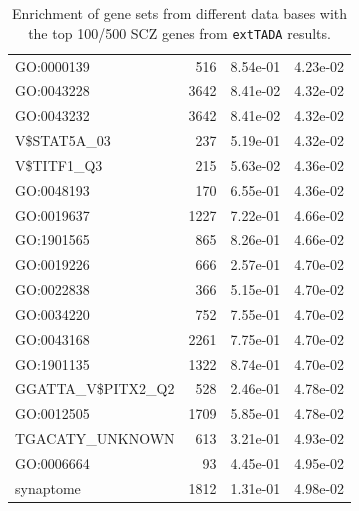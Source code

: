 \documentclass[]{article}
\begin{document}
\begin{table}[H]
\begin{tabular}{|l|rrr|}
GO:0000139 & 516 & 8.54e-01 & 4.23e-02\\
GO:0043228 & 3642 & 8.41e-02 & 4.32e-02\\
GO:0043232 & 3642 & 8.41e-02 & 4.32e-02\\
V\$STAT5A\_03 & 237 & 5.19e-01 & 4.32e-02\\
V\$TITF1\_Q3 & 215 & 5.63e-02 & 4.36e-02\\
GO:0048193 & 170 & 6.55e-01 & 4.36e-02\\
GO:0019637 & 1227 & 7.22e-01 & 4.66e-02\\
GO:1901565 & 865 & 8.26e-01 & 4.66e-02\\
GO:0019226 & 666 & 2.57e-01 & 4.70e-02\\
GO:0022838 & 366 & 5.15e-01 & 4.70e-02\\
GO:0034220 & 752 & 7.55e-01 & 4.70e-02\\
GO:0043168 & 2261 & 7.75e-01 & 4.70e-02\\
GO:1901135 & 1322 & 8.74e-01 & 4.70e-02\\
GGATTA\_V\$PITX2\_Q2 & 528 & 2.46e-01 & 4.78e-02\\
GO:0012505 & 1709 & 5.85e-01 & 4.78e-02\\
TGACATY\_UNKNOWN & 613 & 3.21e-01 & 4.93e-02\\
GO:0006664 & 93 & 4.45e-01 & 4.95e-02\\
synaptome & 1812 & 1.31e-01 & 4.98e-02\\

\hline
\end{tabular}
\normalsize
\caption{Enrichment of gene sets from different data bases with the top 100/500 SCZ genes from \texttt{extTADA} results.}
\label{tab:enrichmentGeneSetDataDrivenApproach}
\end{table}
\end{document}
